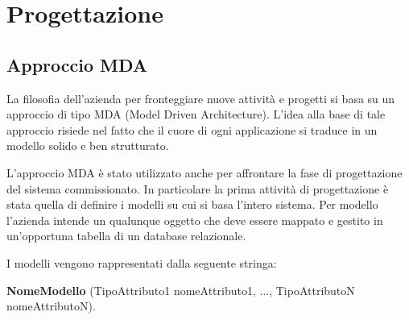 \chapter{Progettazione}
\label{cap:progettazione}


\setlength{\parskip}{3ex}

\section{Approccio MDA}
La filosofia dell'azienda per fronteggiare nuove attività e progetti si basa su un approccio di tipo MDA (Model Driven Architecture). L'idea alla base di tale approccio risiede nel fatto che il cuore di ogni applicazione si traduce in un modello solido e ben strutturato. 

\setlength{\parskip}{3ex}

\noindent L'approccio MDA è stato utilizzato anche per affrontare la fase di progettazione del sistema commissionato. In particolare la prima attività di progettazione è stata quella di definire i modelli su cui si basa l'intero sistema. Per modello l'azienda intende un qualunque oggetto che deve essere mappato e gestito in un'opportuna tabella di un database relazionale.   

\setlength{\parskip}{3ex}

\noindent I modelli vengono rappresentati dalla seguente stringa:

\setlength{\parskip}{2ex}

\noindent \textbf{NomeModello} (TipoAttributo1 nomeAttributo1, ..., TipoAttributoN nomeAttributoN).

\pagebreak

